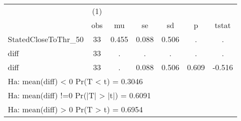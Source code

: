 {
\def\sym#1{\ifmmode^{#1}\else\(^{#1}\)\fi}
\begin{tabular}{l*{1}{cccccc}}
\hline\hline
                    &\multicolumn{1}{c}{(1)}&            &            &            &            &            \\
                    &         obs&          mu&          se&          sd&           p&       tstat\\
\hline
StatedCloseToThr\_50 &          33&       0.455&       0.088&       0.506&           .&           .\\
diff                &          33&           .&           .&           .&           .&           .\\
diff                &          33&           .&       0.088&       0.506&       0.609&      -0.516\\
\hline\hline
\multicolumn{7}{l}{\footnotesize Ha: mean(diff) < 0   Pr(T < t) = 0.3046}\\
\multicolumn{7}{l}{\footnotesize Ha: mean(diff) !=0   Pr(|T| > |t|) = 0.6091}\\
\multicolumn{7}{l}{\footnotesize Ha: mean(diff) > 0   Pr(T > t) = 0.6954}\\
\end{tabular}
}

